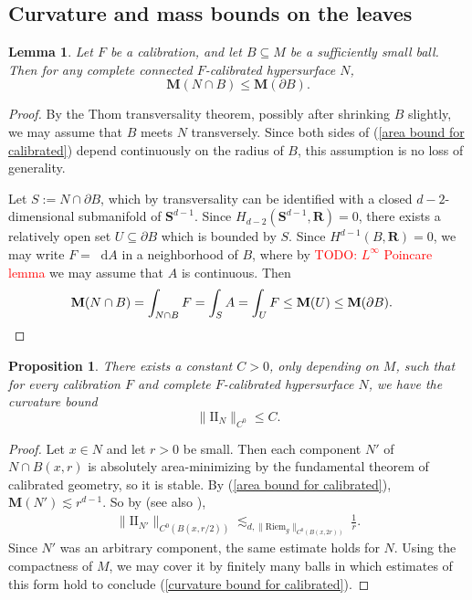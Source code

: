 \documentclass[reqno,11pt]{amsart}
\newcommand{\RR}{\mathbf{R}}
\newcommand{\Sph}{\mathbf S}
\newcommand*\dif{\mathop{}\!\mathrm{d}}
\newcommand{\Two}{\mathrm{I\!I}}
\newcommand{\Riem}{\mathrm{Riem}}
\newcommand{\Mass}{\mathbf M}
\newtheorem{lemma}[theorem]{Lemma}
\newtheorem{proposition}[theorem]{Proposition}
\theoremstyle{definition}
\numberwithin{equation}{section}
\newcommand\todo[1]{\textcolor{red}{TODO: #1}}
\begin{document}
\subsection{Curvature and mass bounds on the leaves}
\begin{lemma}
Let $F$ be a calibration, and let $B \subseteq M$ be a sufficiently small ball.
Then for any complete connected $F$-calibrated hypersurface $N$, 
\begin{equation}\label{area bound for calibrated}
\Mass(N \cap B) \leq \Mass(\partial B).
\end{equation}
\end{lemma}
\begin{proof}
By the Thom transversality theorem, possibly after shrinking $B$ slightly, we may assume that $B$ meets $N$ transversely.
Since both sides of (\ref{area bound for calibrated}) depend continuously on the radius of $B$, this assumption is no loss of generality.

Let $S := N \cap \partial B$, which by transversality can be identified with a closed $d - 2$-dimensional submanifold of $\Sph^{d - 1}$.
Since $H_{d - 2}(\Sph^{d - 1}, \RR) = 0$, there exists a relatively open set $U \subseteq \partial B$ which is bounded by $S$.
Since $H^{d - 1}(B, \RR) = 0$, we may write $F = \dif A$ in a neighborhood of $B$, where by \todo{$L^\infty$ Poincare lemma} we may assume that $A$ is continuous.
Then
\begin{align*}
\Mass(N \cap B) &= \int_{N \cap B} F = \int_S A = \int_U F \leq \Mass(U) \leq \Mass(\partial B). \qedhere
\end{align*}
\end{proof}

\begin{proposition}
There exists a constant $C > 0$, only depending on $M$, such that for every calibration $F$ and complete $F$-calibrated hypersurface $N$, we have the curvature bound
\begin{equation}\label{curvature bound for calibrated}
\|\Two_N\|_{C^0} \leq C.
\end{equation}
\end{proposition}
\begin{proof}
Let $x \in N$ and let $r > 0$ be small.
Then each component $N'$ of $N \cap B(x, r)$ is absolutely area-minimizing by the fundamental theorem of calibrated geometry, so it is stable.
By (\ref{area bound for calibrated}), $\Mass(N') \lesssim r^{d - 1}$.
So by \cite[pg785, Corollary 1]{Schoen81} (see also \cite[Chapter 2, \S\S4-5]{colding2011course}),
\begin{align*}
\|\Two_{N'}\|_{C^0(B(x, r/2))} \lesssim_{d, \|\Riem_g\|_{C^0(B(x, 2r))}} \frac{1}{r}.
\end{align*}
Since $N'$ was an arbitrary component, the same estimate holds for $N$.
Using the compactness of $M$, we may cover it by finitely many balls in which estimates of this form hold to conclude (\ref{curvature bound for calibrated}).
\end{proof}
\end{document}
